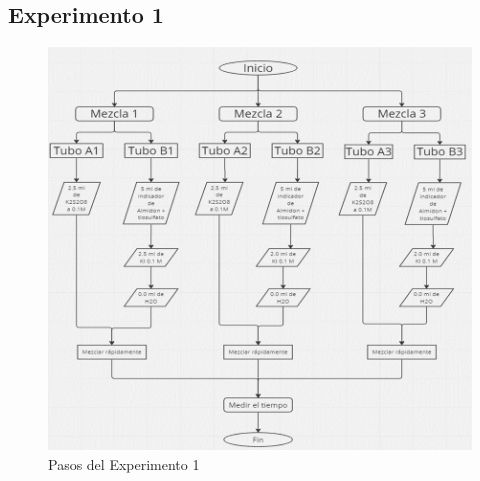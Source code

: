 \documentclass[../main]{subfiles}
\begin{document}
\subsection{Experimento 1}
\begin{figure}[H]
  \begin{center}
    \includegraphics[height=0.5\textheight]{res/flow1.png}
  \end{center}
  \caption{Pasos del Experimento 1}\label{fig:proc1}
\end{figure}
\end{document}

